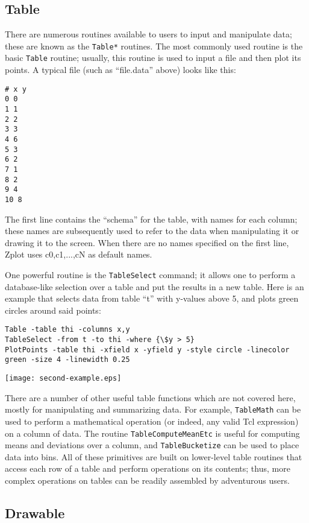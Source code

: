 \subsection{Table}

There are numerous routines available to users to input and manipulate data;
these are known as the \texttt{Table*} routines. The most commonly used
routine is the basic \texttt{Table} routine; usually, this routine is used to
input a file and then plot its points. A typical file (such as ``file.data''
above) looks like this:
\begin{verbatim}
# x y
0 0 
1 1 
2 2 
3 3 
4 6 
5 3 
6 2 
7 1 
8 2 
9 4 
10 8
\end{verbatim}
The first line contains the ``schema'' for the table, with names for each
column; these names are subsequently used to refer to the data when
manipulating it or drawing it to the screen. When there are no names specified
on the first line, Zplot uses c0,c1,...,cN as default names.

One powerful routine is the \texttt{TableSelect} command; it allows one to
perform a database-like selection over a table and put the results in a new
table. Here is an example that selects data from table ``t'' with y-values
above 5, and plots green circles around said points:
\begin{verbatim}
Table -table thi -columns x,y
TableSelect -from t -to thi -where {\$y > 5}
PlotPoints -table thi -xfield x -yfield y -style circle -linecolor green -size 4 -linewidth 0.25
\end{verbatim}

\texttt{[image: second-example.eps]}

There are a number of other useful table functions which are not covered here,
mostly for manipulating and summarizing data. For example, \texttt{TableMath}
can be used to perform a mathematical operation (or indeed, any valid Tcl
expression) on a column of data. The routine \texttt{TableComputeMeanEtc} is
useful for computing means and deviations over a column, and
\texttt{TableBucketize} can be used to place data into bins. All of these
primitives are built on lower-level table routines that access each row of a
table and perform operations on its contents; thus, more complex operations on
tables can be readily assembled by adventurous users.

\subsection{Drawable}


